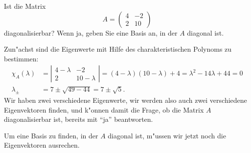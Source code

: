Ist die Matrix
\[
A=\begin{pmatrix}
4&-2\\
2&10
\end{pmatrix}
\]
diagonalisierbar? Wenn ja, geben Sie eine Basis an, in der $A$ diagonal
ist.

\begin{loesung}
Zun"achst sind die Eigenwerte mit Hilfe des charakteristischen Polynoms
zu bestimmen:
\begin{align*}
\chi_A(\lambda)
&=
\left|
\begin{matrix}
4-\lambda&-2\\
2&10-\lambda
\end{matrix}
\right|
=
(4-\lambda)(10-\lambda)+4
=
\lambda^2-14\lambda+44
=0
\\
\lambda_{\pm}
&=
7\pm\sqrt{49-44}=7\pm\sqrt{5}.
\end{align*}
Wir haben zwei verschiedene Eigenwerte, wir werden also auch zwei
verschiedene Eigenvektoren finden, und k"onnen damit die Frage, ob 
die Matrix $A$ diagonalisierbar ist, bereits mit ``ja'' beantworten.

Um eine Basis zu finden, in der $A$ diagonal ist, m"ussen wir jetzt
noch die Eigenvektoren ausrechen.


\end{loesung}
